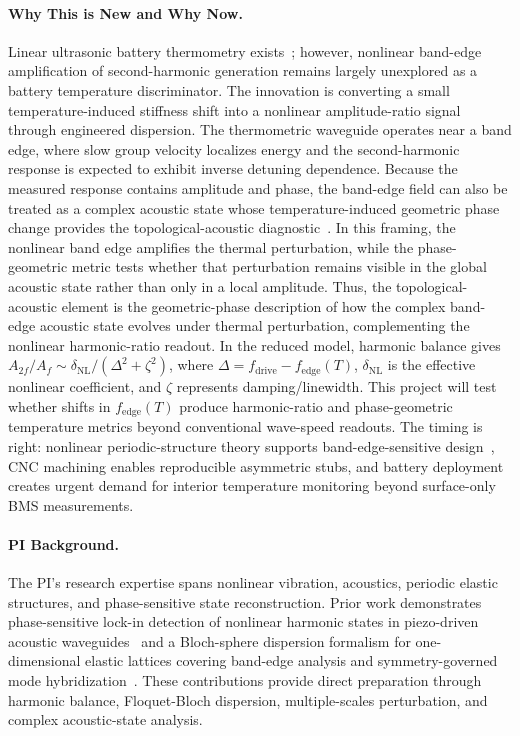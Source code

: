 \documentclass[11pt]{article}
\begin{document}
\paragraph{Why This is New and Why Now.}
Linear ultrasonic battery thermometry exists~\cite{Cheng2024,Williams2024}; however, nonlinear band-edge amplification of second-harmonic generation remains largely unexplored as a battery temperature discriminator. The innovation is converting a small temperature-induced stiffness shift into a nonlinear amplitude-ratio signal through engineered dispersion. The thermometric waveguide operates near a band edge, where slow group velocity localizes energy and the second-harmonic response is expected to exhibit inverse detuning dependence. Because the measured response contains amplitude and phase, the band-edge field can also be treated as a complex acoustic state whose temperature-induced geometric phase change provides the topological-acoustic diagnostic~\cite{Zhang2024SensorsGPC}. In this framing, the nonlinear band edge amplifies the thermal perturbation, while the phase-geometric metric tests whether that perturbation remains visible in the global acoustic state rather than only in a local amplitude. Thus, the topological-acoustic element is the geometric-phase description of how the complex band-edge acoustic state evolves under thermal perturbation, complementing the nonlinear harmonic-ratio readout. In the reduced model, harmonic balance gives $A_{2f}/A_f \sim \delta_\mathrm{NL}/(\Delta^2+\zeta^2)$, where $\Delta = f_\mathrm{drive} - f_\mathrm{edge}(T)$, $\delta_\mathrm{NL}$ is the effective nonlinear coefficient, and $\zeta$ represents damping/linewidth. This project will test whether shifts in $f_\mathrm{edge}(T)$ produce harmonic-ratio and phase-geometric temperature metrics beyond conventional wave-speed readouts. The timing is right: nonlinear periodic-structure theory supports band-edge-sensitive design~\cite{Lazarov2007}, CNC machining enables reproducible asymmetric stubs, and battery deployment creates urgent demand for interior temperature monitoring beyond surface-only BMS measurements.

\paragraph{PI Background.}
The PI's research expertise spans nonlinear vibration, acoustics, periodic elastic structures, and phase-sensitive state reconstruction. Prior work demonstrates phase-sensitive lock-in detection of nonlinear harmonic states in piezo-driven acoustic waveguides~\cite{Mahmood2022} and a Bloch-sphere dispersion formalism for one-dimensional elastic lattices covering band-edge analysis and symmetry-governed mode hybridization~\cite{Mahmood2026a}. These contributions provide direct preparation through harmonic balance, Floquet-Bloch dispersion, multiple-scales perturbation, and complex acoustic-state analysis.
\end{document}
